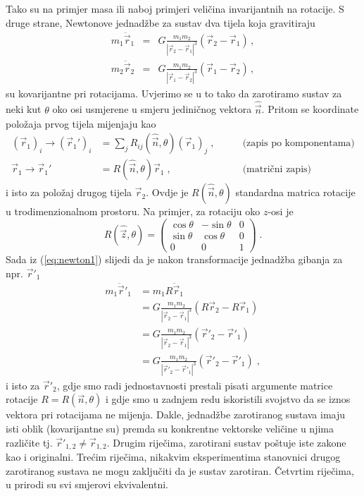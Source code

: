 Tako su na primjer masa ili naboj primjeri veličina invarijantnih na rotacije.
S druge strane, Newtonove jednadžbe za sustav dva tijela koja gravitiraju
\begin{eqnarray}
 m_1 \ddot{\vec{r}}_1 & = & G \frac{m_1 m_2}{|\vec{r}_2 - \vec{r}_1|^3}
    (\vec{r}_2 - \vec{r}_1) \label{eq:newton1} \,, \\
 m_2 \ddot{\vec{r}}_2 & = & G \frac{m_1 m_2}{|\vec{r}_1 - \vec{r}_2|^3}
    (\vec{r}_1 - \vec{r}_2) \,,
\end{eqnarray}
su kovarijantne pri rotacijama. Uvjerimo se u to tako da zarotiramo
sustav za neki kut $\theta$ oko osi usmjerene u smjeru jediničnog vektora $\hat{\vec{n}}$.
Pritom se koordinate položaja prvog tijela mijenjaju kao
\begin{align*}
(\vec{r}_{1})_i \to (\vec{r}_{1}')_i &= \sum_j R_{ij}(\hat{\vec{n}},\theta) 
   (\vec{r}_{1})_j \;, \qquad& \text{(zapis po komponentama)}\\
\vec{r}_{1}\to \vec{r}_{1}' &= R(\hat{\vec{n}},\theta) 
   \vec{r}_{1}\;, \qquad& \text{(matrični zapis)}
\end{align*}
i isto za položaj drugog tijela $\vec{r}_2$.
Ovdje je $R(\hat{\vec{n}},\theta)$ standardna matrica rotacije u trodimenzionalnom
prostoru. Na primjer, za rotaciju oko $z$-osi je
\begin{equation}
R(\hat{\vec{z}},\theta) = \begin{pmatrix}
\cos\theta &  -\sin\theta &  0 \\
\sin\theta &  \cos\theta &  0 \\
    0  &       0     &  1 
\end{pmatrix} \;.
\label{eq:matrot}
\end{equation}
Sada iz (\ref{eq:newton1}) slijedi da je nakon transformacije
jednadžba gibanja za npr. $\vec{r}'_1$ 
\begin{equation}
\begin{split}
m_1 \ddot{\vec{r}}'_1 &= m_1 R \ddot{\vec{r}}_1 \\
   &= G \frac{m_1 m_2}{|\vec{r}_2 - \vec{r}_1|^3}
    (R\vec{r}_2 - R\vec{r}_1) \\
   &= G \frac{m_1 m_2}{|\vec{r}_2 - \vec{r}_1|^3}
    (\vec{r}'_2 - \vec{r}'_1) \\
   &= G \frac{m_1 m_2}{|\vec{r}'_2 - \vec{r}'_1|^3}
    (\vec{r}'_2 - \vec{r}'_1) \;,
\end{split}
\label{eq:kovarijantniNewton}
\end{equation}
i isto za $\vec{r}'_2$, gdje smo radi jednostavnosti prestali
pisati argumente matrice rotacije $R = R(\vec{n},\theta)$
i gdje smo u zadnjem redu iskoristili svojstvo da se iznos
vektora pri rotacijama ne mijenja.
Dakle, jednadžbe zarotiranog sustava imaju isti oblik
(kovarijantne su) premda su konkrentne vektorske veličine
u njima različite tj. $\vec{r}'_{1,2} \neq \vec{r}_{1,2}$.
Drugim riječima, zarotirani sustav poštuje iste zakone kao
i originalni. Trećim riječima, nikakvim eksperimentima stanovnici
drugog zarotiranog sustava ne mogu zaključiti da je sustav zarotiran.
Četvrtim riječima, u prirodi su svi smjerovi ekvivalentni.

